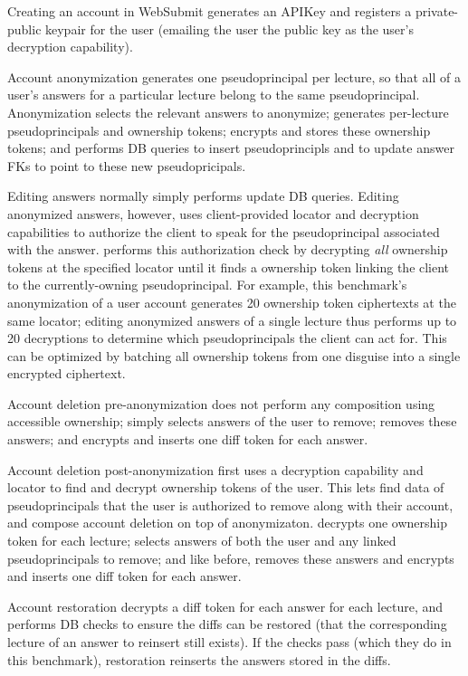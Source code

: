 Creating an account in WebSubmit generates an APIKey and registers a private-public keypair for the
user (emailing the user the public key as the user's decryption capability).

Account anonymization generates one pseudoprincipal per lecture, so that all of a user's answers for
a particular lecture belong to the same pseudoprincipal.
Anonymization selects the relevant answers to anonymize; generates per-lecture
pseudoprincipals and ownership tokens; encrypts and stores these ownership tokens; and
performs DB
queries to insert pseudoprincipls and to update answer FKs to point to these new pseudopricipals.

Editing answers normally simply performs update DB queries. Editing anonymized answers, however,
uses client-provided locator and decryption capabilities to authorize the client to speak for the
pseudoprincipal associated with the answer.  \sys performs this authorization check by decrypting
\emph{all} ownership tokens at the specified locator until it finds a ownership token linking the
client to the currently-owning pseudoprincipal. For example, this benchmark's anonymization of a
user account generates 20 ownership token ciphertexts at the same locator; editing anonymized
answers of a single lecture thus performs up to 20 decryptions to determine which pseudoprincipals
the client can act for. This can be optimized by batching all ownership tokens from one disguise
into a single encrypted ciphertext.

Account deletion pre-anonymization does not perform any composition using accessible
ownership; \sys simply selects answers of the user to remove; removes these answers; and encrypts
and inserts one diff token for each answer.

Account deletion post-anonymization first uses a decryption capability and locator to find and decrypt
ownership tokens of the user. This lets \sys find data of pseudoprincipals that the user is authorized to
remove along with their account, and compose account deletion on top of anonymizaton.
\sys decrypts one ownership token for each lecture; selects answers of both
the user and any linked pseudoprincipals to remove; and like before, removes these answers and
encrypts and inserts one diff token for each answer.

Account restoration decrypts a diff token for each answer for each lecture, and performs DB checks
to ensure the diffs can be restored (\eg that the corresponding lecture of an answer to reinsert
still exists). If the checks pass (which they do in this benchmark), restoration reinserts the
answers stored in the diffs.

